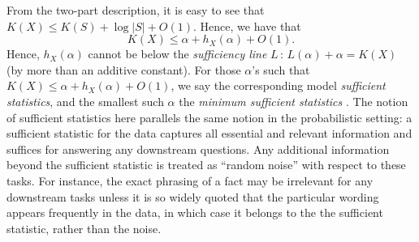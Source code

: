 \documentclass[11pt]{article}
\theoremstyle{plain}
\theoremstyle{definition}
\begin{document}
From the two-part description, it is easy to see that
$
K(X)\leq K(S)+\log |S|+O(1).
$
Hence, we have that 
$$
K(X)\leq \alpha+h_X(\alpha) +O(1).
$$
Hence, $h_X(\alpha)$ cannot be below the {\em sufficiency line} $L\,: \, L(\alpha)+\alpha = K(X)$ (by more than an additive constant).
For those $\alpha$'s such that 
$K(X)\leq \alpha+h_X(\alpha) +O(1)$,
we say the corresponding model {\em sufficient statistics},
and the smallest such $\alpha$ the {\em minimum sufficient statistics}
\citep{gacs2001algorithmic}.
The notion of sufficient statistics here parallels the same notion in the probabilistic setting: a sufficient statistic for the data captures all essential and relevant information and suffices for answering any downstream questions. Any additional information beyond the sufficient statistic is treated as “random noise” with respect to these tasks. For instance, the exact phrasing of a fact may be irrelevant for any downstream tasks unless it is so widely quoted that the particular wording appears frequently in the data, in which case it belongs to the  the sufficient statistic, rather than the noise.
\end{document}
